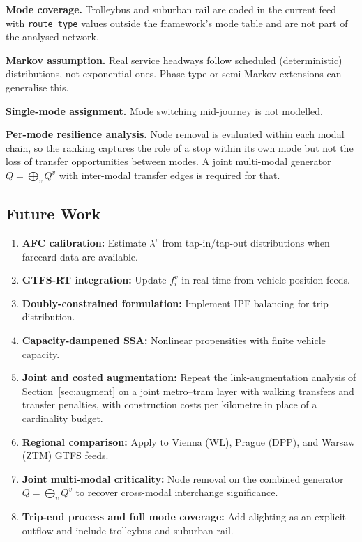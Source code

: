 \documentclass[12pt,a4paper]{article}
\theoremstyle{plain}
\theoremstyle{definition}
\theoremstyle{remark}
\begin{document}
\textbf{Mode coverage.}  Trolleybus and suburban rail are coded in the current
feed with \texttt{route\_type} values outside the framework's mode table and
are not part of the analysed network.

\textbf{Markov assumption.}  Real service headways follow scheduled
(deterministic) distributions, not exponential ones.  Phase-type or
semi-Markov extensions \citep{norris1997} can generalise this.

\textbf{Single-mode assignment.}  Mode switching mid-journey is not modelled.

\textbf{Per-mode resilience analysis.}  Node removal is evaluated within
each modal chain, so the ranking captures the role of a stop within its own
mode but not the loss of transfer opportunities between modes.  A joint
multi-modal generator $Q=\bigoplus_v Q^v$ with inter-modal transfer edges is
required for that.

\subsection{Future Work}

\begin{enumerate}
  \item \textbf{AFC calibration:} Estimate $\lambda^v$ from tap-in/tap-out
    distributions when farecard data are available.
  \item \textbf{GTFS-RT integration:} Update $f^v_i$ in real time from
    vehicle-position feeds.
  \item \textbf{Doubly-constrained formulation:} Implement IPF balancing
    for trip distribution.
  \item \textbf{Capacity-dampened SSA:} Nonlinear propensities with finite
    vehicle capacity.
  \item \textbf{Joint and costed augmentation:} Repeat the link-augmentation
    analysis of Section~\ref{sec:augment} on a joint metro--tram layer with
    walking transfers and transfer penalties, with construction costs per
    kilometre in place of a cardinality budget.
  \item \textbf{Regional comparison:} Apply to Vienna (WL), Prague (DPP),
    and Warsaw (ZTM) GTFS feeds.
  \item \textbf{Joint multi-modal criticality:} Node removal on the combined
    generator $Q=\bigoplus_v Q^v$ to recover cross-modal interchange
    significance.
  \item \textbf{Trip-end process and full mode coverage:} Add alighting as
    an explicit outflow and include trolleybus and suburban rail.
\end{enumerate}
\end{document}
